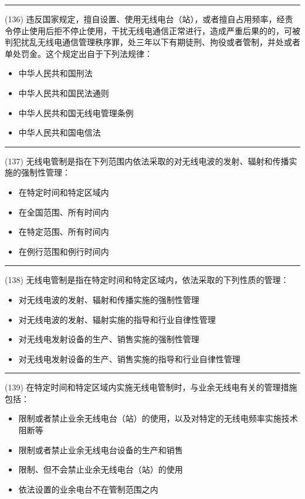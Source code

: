 \documentclass[twocolumn]{ctexart}  %
\begin{document}
\noindent\rule{0.5\textwidth}{1pt}
\heiti (136) 违反国家规定，擅自设置、使用无线电台（站），或者擅自占用频率，经责令停止使用后拒不停止使用，干扰无线电通信正常进行，造成严重后果的的，可被判犯扰乱无线电通信管理秩序罪，处三年以下有期徒刑、拘役或者管制，并处或者单处罚金。这个规定出自于下列法规律： \songti {\color{gray} [LK0103] }
\begin{itemize}
	\item  中华人民共和国刑法
	\item  中华人民共和国民法通则
	\item  中华人民共和国无线电管理条例
	\item  中华人民共和国电信法
\end{itemize}


\noindent\rule{0.5\textwidth}{1pt}
\heiti (137) 无线电管制是指在下列范围内依法采取的对无线电波的发射、辐射和传播实施的强制性管理： \songti {\color{gray} [LK0105] }
\begin{itemize}
	\item  在特定时间和特定区域内
	\item  在全国范围、所有时间内
	\item  在特定范围、所有时间内
	\item  在例行范围和例行时间内
\end{itemize}


\noindent\rule{0.5\textwidth}{1pt}
\heiti (138) 无线电管制是指在特定时间和特定区域内，依法采取的下列性质的管理： \songti {\color{gray} [LK0106] }
\begin{itemize}
	\item  对无线电波的发射、辐射和传播实施的强制性管理
	\item  对无线电波的发射、辐射实施的指导和行业自律性管理
	\item  对无线电发射设备的生产、销售实施的强制性管理
	\item  对无线电发射设备的生产、销售实施的指导和行业自律性管理
\end{itemize}


\noindent\rule{0.5\textwidth}{1pt}
\heiti (139) 在特定时间和特定区域内实施无线电管制时，与业余无线电有关的管理措施包括： \songti {\color{gray} [LK0107] }
\begin{itemize}
	\item  限制或者禁止业余无线电台（站）的使用，以及对特定的无线电频率实施技术阻断等
	\item  限制或者禁止业余无线电台设备的生产和销售
	\item  限制、但不会禁止业余无线电台（站）的使用
	\item  依法设置的业余电台不在管制范围之内
\end{itemize}
\end{document}
